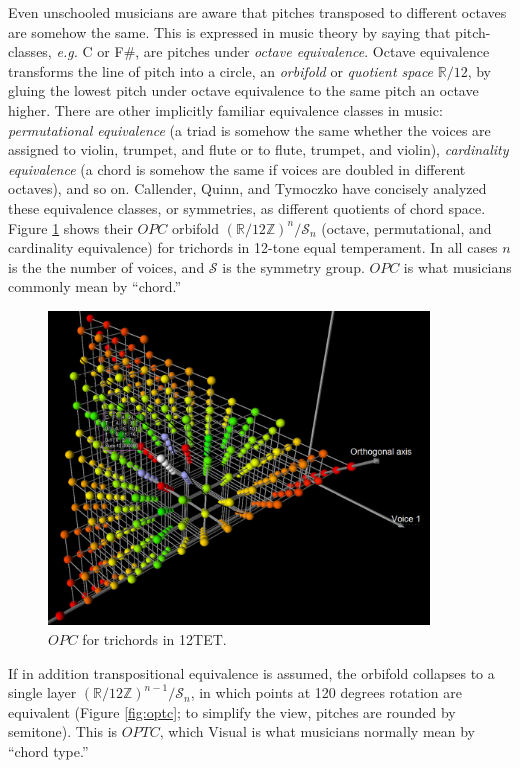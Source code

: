 \documentclass[english,11pt,letterpaper,onecolumn]{scrartcl}
\numberwithin{equation}{section}
\begin{document}
Even unschooled musicians are aware that pitches transposed to different 
octaves are somehow the same. This is expressed in music theory by saying that 
pitch-classes, \textit{e.g.} C or F\#, are pitches under \textit{octave 
equivalence}. Octave equivalence transforms the line of pitch into a circle, 
an \textit{orbifold} or \textit{quotient space} $\mathbb{R}/12$, by gluing the 
lowest pitch under octave equivalence to the same pitch an octave higher. There 
are other implicitly familiar equivalence classes in music: 
\textit{permutational equivalence} (a triad is somehow the same whether the 
voices are assigned to violin, trumpet, and flute or to flute, trumpet, and 
violin), \textit{cardinality equivalence} (a chord is somehow the same if 
voices are doubled in different octaves), and so on. Callender, Quinn, and 
Tymoczko \cite{callender:346} have concisely analyzed these equivalence 
classes, or symmetries, as different quotients of chord space. Figure 
\ref{fig:opc} shows their $OPC$ orbifold  
$\left(\mathbb{R}/12\mathbb{Z}\right)^{n}/\mathcal{S}_{n}$ (octave, 
permutational, and cardinality equivalence) for trichords in 12-tone equal 
temperament. In all cases $n$ is the the number of voices, and $\mathcal{S}$ 
is the symmetry group. $OPC$ is what musicians commonly mean by ``chord.''

    \begin{figure}
        \centerline{\includegraphics[width = 0.9\textwidth]{opc}}
        \caption{\label{fig:opc} 
           $OPC$ for trichords in 12TET.}
    \end{figure}
    
If in addition transpositional equivalence is assumed, the orbifold collapses 
to a single layer $\left(\mathbb{R}/12\mathbb{Z}\right)^{n-1}/\mathcal{S}_{n}$, 
in which points at 120 degrees rotation are equivalent (Figure \ref{fig:optc}; 
to simplify the view, pitches are rounded by semitone). This is $OPTC$, which 
Visual
is what musicians normally mean by ``chord type.''
\end{document}
